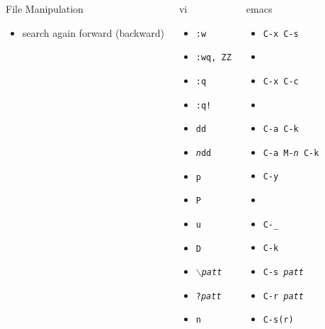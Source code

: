 \documentclass[slidestop,mathserif,compress,xcolor=svgnames]{beamer}
\newenvironment{eblock}[0]
{
\begin{beamerboxesrounded}[upper=uppercol2,lower=lowercol2,shadow=true]}
{\end{beamerboxesrounded}}
\begin{document}
\begin{frame}[allowframebreaks]
{\begin{columns}
\begin{eblock}{File Manipulation}
\begin{itemize}
      \item search again forward (backward)
    \end{itemize}
    \end{eblock}
     \vspace{-0.5cm}
    \begin{eblock}{vi}
    \begin{itemize}
      \item \texttt{:w}
      \item \texttt{:wq, ZZ}
      \item \texttt{:q}
      \item \texttt{:q!}
      \item \texttt{dd}
      \item \texttt{\textit{n}dd}
      \item \texttt{p}
      \item \texttt{P}
      \item \texttt{u}
      \item \texttt{D}
      \item \texttt{$\backslash$\textit{patt}}
      \item \texttt{?\textit{patt}}
      \item \texttt{n}
    \end{itemize}
    \end{eblock}
     \vspace{-0.5cm}
    \begin{eblock}{emacs}
    \begin{itemize}
      \item \texttt{C-x C-s}
      \item \texttt{}
      \item \texttt{C-x C-c}
      \item \texttt{}
      \item \texttt{C-a C-k}
      \item \texttt{C-a M-\textit{n} C-k}
      \item \texttt{C-y}
      \item
      \item \texttt{C-\_}
      \item \texttt{C-k}
      \item \texttt{C-s \textit{patt}}
      \item \texttt{C-r \textit{patt}}
      \item \texttt{C-s(r)}
    \end{itemize}
    \end{eblock}

\end{columns}}
\end{frame}
\end{document}
